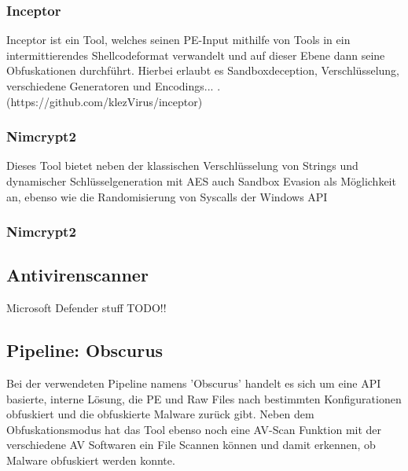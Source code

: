     \subsubsection{Inceptor}
    Inceptor ist ein Tool, welches seinen PE-Input mithilfe von Tools in ein intermittierendes Shellcodeformat verwandelt und auf dieser Ebene dann seine Obfuskationen durchführt. Hierbei erlaubt es Sandboxdeception, Verschlüsselung, verschiedene Generatoren und Encodings...
    \cite{wauters_2024_building}.
    (https://github.com/klezVirus/inceptor)    \subsubsection{Nimcrypt2}
    Dieses Tool bietet neben der klassischen Verschlüsselung von Strings und dynamischer Schlüsselgeneration mit AES auch Sandbox Evasion als Möglichkeit an, ebenso wie die Randomisierung von Syscalls der Windows API
    \subsubsection{Nimcrypt2}
    \cite{icyguider_2022_nimcrypt}

    
\subsection{Antivirenscanner}
Microsoft Defender stuff
TODO!!

\subsection{Pipeline: Obscurus}
Bei der verwendeten Pipeline namens 'Obscurus' handelt es sich um eine API basierte, interne Lösung, die PE und Raw Files nach bestimmten Konfigurationen obfuskiert und die obfuskierte Malware zurück gibt. Neben dem Obfuskationsmodus hat das Tool ebenso noch eine AV-Scan Funktion mit der verschiedene AV Softwaren ein File Scannen können und damit erkennen, ob Malware obfuskiert werden konnte.